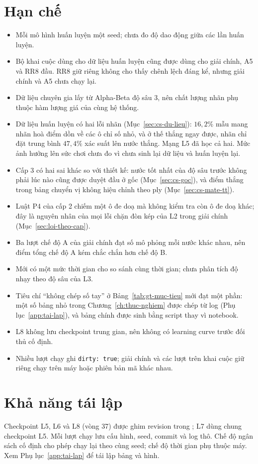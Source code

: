 \section{Hạn chế}
\begin{itemize}
\item Mỗi mô hình huấn luyện một seed; chưa đo độ dao động giữa các lần huấn luyện.
\item Bộ khai cuộc dùng cho dữ liệu huấn luyện cũng được dùng cho giải chính, A5 và RR8 đầu. RR8 giữ riêng không cho thấy chênh lệch đáng kể, nhưng giải chính và A5 chưa chạy lại.
\item Dữ liệu chuyên gia lấy từ Alpha-Beta độ sâu 3, nên chất lượng nhãn phụ thuộc hàm lượng giá của cùng hệ thống.
\item Dữ liệu huấn luyện có hai lỗi nhãn (Mục~\ref{sec:cs-du-lieu}): $16{,}2\%$ mẫu mang nhãn hoà điểm dồn về các ô chỉ số
nhỏ, và ở thế thắng ngay được, nhãn chỉ đặt trung bình $47{,}4\%$ xác suất lên nước thắng. Mạng L5 đã học cả hai. Mức
ảnh hưởng lên sức chơi chưa đo vì chưa sinh lại dữ liệu và huấn luyện lại.
\item Cấp 3 có hai sai khác so với thiết kế: nước tốt nhất của độ sâu trước không phải lúc nào cũng được duyệt đầu ở gốc
(Mục~\ref{sec:cs-goc}), và điểm thắng trong bảng chuyển vị không hiệu chỉnh theo ply (Mục~\ref{sec:cs-mate-tt}).
\item Luật P4 của cấp 2 chiếm một ô đe doạ mà không kiểm tra còn ô đe doạ khác; đây là nguyên nhân của mọi lỗi chặn đòn kép
của L2 trong giải chính (Mục~\ref{sec:loi-theo-cap}).
\item Ba lượt chế độ A của giải chính đạt số mô phỏng mỗi nước khác nhau, nên điểm tổng chế độ A kém chắc chắn hơn chế độ B.
\item Mới có một mức thời gian cho so sánh cùng thời gian; chưa phân tích độ nhạy theo độ sâu của L3.
\item Tiêu chí ``không chép số tay'' ở Bảng~\ref{tab:gt-muc-tieu} mới đạt một phần: một số bảng nhỏ trong Chương~\ref{ch:thuc-nghiem}
được chép từ log (Phụ lục~\ref{app:tai-lap}), và bảng chính được sinh bằng script thay vì notebook.
\item L8 không lưu checkpoint trung gian, nên không có learning curve trước đối thủ cố định.
\item Nhiều lượt chạy ghi \texttt{dirty: true}; giải chính và các lượt trên khai cuộc giữ riêng chạy trên máy hoặc phiên bản mã khác nhau.
\end{itemize}

\section{Khả năng tái lập}
Checkpoint L5, L6 và L8 (vòng 37) được ghim revision trong ; L7 dùng chung checkpoint L5. Mỗi lượt chạy lưu cấu hình, seed, commit và log thô. Chế độ ngân sách cố định cho phép chạy lại theo cùng seed; chế độ thời gian phụ thuộc máy. Xem Phụ lục~\ref{app:tai-lap} để tái lập bảng và hình.

